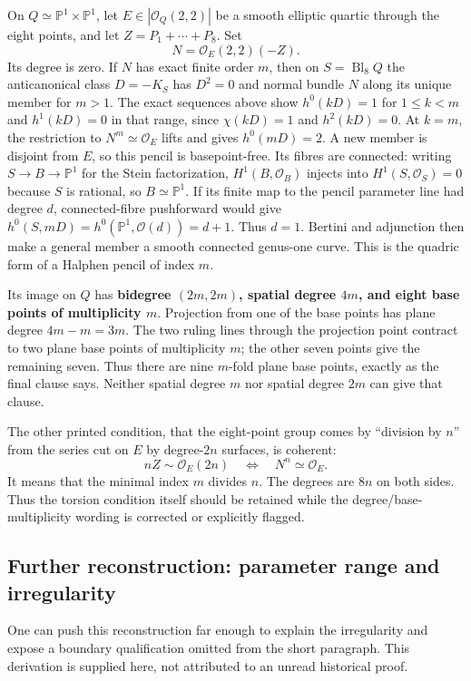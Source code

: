 On \(Q\simeq\mathbb P^1\times\mathbb P^1\), let \(E\in|\mathcal O_Q(2,2)|\) be a smooth elliptic quartic through the eight points, and let \(Z=P_1+\cdots+P_8\). Set \[
 N=\mathcal O_E(2,2)(-Z).
\] Its degree is zero. If \(N\) has exact finite order \(m\), then on \(S=\operatorname{Bl}_8Q\) the anticanonical class \(D=-K_S\) has \(D^2=0\) and normal bundle \(N\) along its unique member for \(m>1\). The exact sequences above show \(h^0(kD)=1\) for \(1\leq k<m\) and \(h^1(kD)=0\) in that range, since \(\chi(kD)=1\) and \(h^2(kD)=0\). At \(k=m\), the restriction to \(N^m\simeq\mathcal O_E\) lifts and gives \(h^0(mD)=2\). A new member is disjoint from \(E\), so this pencil is basepoint-free. Its fibres are connected: writing \(S\to B\to\mathbb P^1\) for the Stein factorization, \(H^1(B,\mathcal O_B)\) injects into \(H^1(S,\mathcal O_S)=0\) because \(S\) is rational, so \(B\simeq\mathbb P^1\). If its finite map to the pencil parameter line had degree \(d\), connected-fibre pushforward would give \(h^0(S,mD)=h^0(\mathbb P^1,\mathcal O(d))=d+1\). Thus \(d=1\). Bertini and adjunction then make a general member a smooth connected genus-one curve. This is the quadric form of a Halphen pencil of index \(m\).

Its image on \(Q\) has \textbf{bidegree \((2m,2m)\), spatial degree \(4m\), and eight base points of multiplicity \(m\)}. Projection from one of the base points has plane degree \(4m-m=3m\). The two ruling lines through the projection point contract to two plane base points of multiplicity \(m\); the other seven points give the remaining seven. Thus there are nine \(m\)-fold plane base points, exactly as the final clause says. Neither spatial degree \(m\) nor spatial degree \(2m\) can give that clause.

The other printed condition, that the eight-point group comes by ``division by \(n\)'' from the series cut on \(E\) by degree-\(2n\) surfaces, is coherent: \[
 nZ\sim\mathcal O_E(2n)
 \quad\Longleftrightarrow\quad N^n\simeq\mathcal O_E.
\] It means that the minimal index \(m\) divides \(n\). The degrees are \(8n\) on both sides. Thus the torsion condition itself should be retained while the degree/base-multiplicity wording is corrected or explicitly flagged.

\subsection{Further reconstruction: parameter range and irregularity}

One can push this reconstruction far enough to explain the irregularity and expose a boundary qualification omitted from the short paragraph. This derivation is supplied here, not attributed to an unread historical proof.

